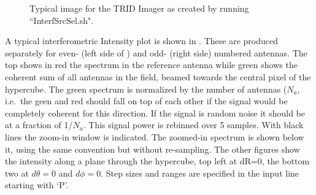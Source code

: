 \begin{figure}[th]
	\caption{Typical image for the TRID Imager as created by running ``InterfSrcSel.sh".}	 
\end{figure}

A typical interferometric Intensity plot is shown in . These are produced separately for even- (left side of ) and odd- (right side) numbered antennas. The top shows in red the spectrum in the reference antenna while green shows the coherent sum of all antennas in the field, beamed towards the central pixel of the hypercube. The green spectrum is normalized by the number of antennas ($N_a$, i.e.\ the geen and red should fall on top of each other if the signal would be completely coherent for this direction. If the signal is random noise it should be at a fraction of 1/$N_a$. This signal power is rebinned over 5 samples. With black lines the zoom-in window is indicated. The zoomed-in spectrum is shown below it, using the same convention but without re-sampling. The other figures show the intensity along a plane through the hypercube, top left at dR=0, the bottom two at $d\theta=0$ and $d\phi=0$. Step sizes and ranges are specified in the input line starting with `P'.


